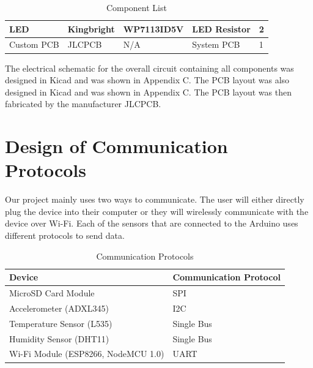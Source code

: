 \documentclass[12pt, titlepage]{article}
\begin{document}
\begin{table}[H]
\begin{tabular}{|p{3cm}|p{2cm}|p{4cm}|p{4cm}|p{2cm}|}
  LED                                
  & Kingbright
  & WP7113ID5V
  & LED Resistor
  & 2
  \newline                            
  \\ \hline

  Custom PCB                                
  & JLCPCB
  & N/A
  & System PCB
  & 1
  \newline                            
  \\ \hline

  \end{tabular}
  \caption{Component List}
\end{table}

The electrical schematic for the overall circuit containing all components was designed in Kicad and was shown in Appendix C. The PCB layout was also designed in Kicad and was shown in Appendix C. The PCB layout was then fabricated by the manufacturer JLCPCB. \\

\newpage





\newpage
\section{Design of Communication Protocols}
Our project mainly uses two ways to communicate. The user will either directly plug the device into their computer or they will wirelessly communicate with the device over Wi-Fi. Each of the sensors that are connected to the Arduino uses different protocols to send data.


\begin{table}[!h]
\begin{tabular}{| p{} | p{}|}
  \hline
  \rowcolor[gray]{0.9}
  Device & Communication Protocol \\
  \hline
  MicroSD Card Module & SPI\\
  \hline
  Accelerometer (ADXL345) &  I2C\\
  \hline
  Temperature Sensor (L535) & Single Bus \\
  \hline
  Humidity Sensor (DHT11) & Single Bus \\
  \hline
  Wi-Fi Module (ESP8266, NodeMCU 1.0) & UART \\
  \hline
 
\end{tabular}
\caption{Communication Protocols}
\end{table}
\end{document}
